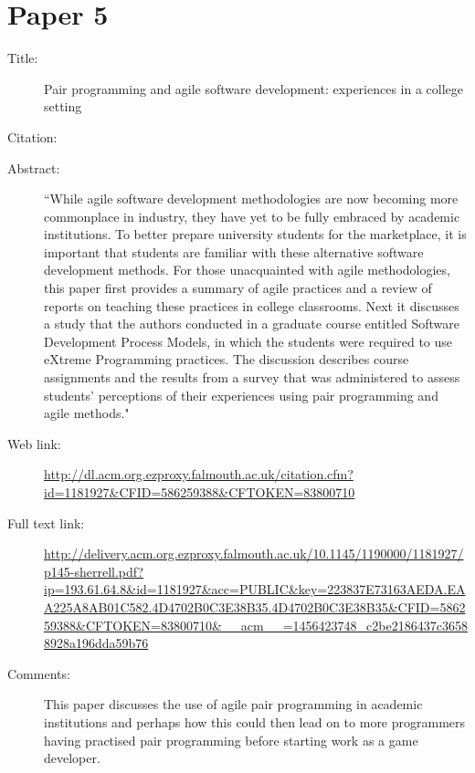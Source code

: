 \documentclass{scrartcl}
\begin{document}
\section*{Paper 5}
\begin{description}
\item[Title:] Pair programming and agile software development: experiences in a college setting
\item[Citation:] \cite{Sherrell:2006}
\item[Abstract:] ``While agile software development methodologies are now becoming more commonplace in industry, they have yet to be fully embraced by academic institutions. To better prepare university students for the marketplace, it is important that students are familiar with these alternative software development methods. For those unacquainted with agile methodologies, this paper first provides a summary of agile practices and a review of reports on teaching these practices in college classrooms. Next it discusses a study that the authors conducted in a graduate course entitled Software Development Process Models, in which the students were required to use eXtreme Programming practices. The discussion describes course assignments and the results from a survey that was administered to assess students' perceptions of their experiences using pair programming and agile methods."
\item[Web link:] \url{http://dl.acm.org.ezproxy.falmouth.ac.uk/citation.cfm?id=1181927&CFID=586259388&CFTOKEN=83800710}
\item[Full text link:] \url{http://delivery.acm.org.ezproxy.falmouth.ac.uk/10.1145/1190000/1181927/p145-sherrell.pdf?ip=193.61.64.8&id=1181927&acc=PUBLIC&key=223837E73163AEDA.EAA225A8AB01C582.4D4702B0C3E38B35.4D4702B0C3E38B35&CFID=586259388&CFTOKEN=83800710&__acm__=1456423748_c2be2186437c36588928a196dda59b76}
\item[Comments:] This paper discusses the use of agile pair programming in academic institutions and perhaps how this could then lead on to more programmers having practised pair programming before starting work as a game developer.
\end{description}
\end{document}
